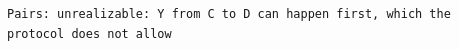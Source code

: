 \begin{lstlisting}[language={},basicstyle=\ttfamily\footnotesize,breaklines=true]
Pairs: unrealizable: Y from C to D can happen first, which the protocol does not allow
\end{lstlisting}
